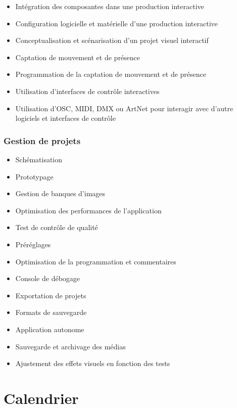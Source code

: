 \documentclass[
]{book}
\providecommand{\tightlist}{%
  \setlength{\itemsep}{0pt}\setlength{\parskip}{0pt}}
\begin{document}
\begin{itemize}
\tightlist
\item
  Intégration des composantes dans une production interactive
\item
  Configuration logicielle et matérielle d'une production interactive\\
\item
  Conceptualisation et scénarisation d'un projet visuel interactif\\
\item
  Captation de mouvement et de présence
\item
  Programmation de la captation de mouvement et de présence
\item
  Utilisation d'interfaces de contrôle interactives
\item
  Utilisation d'OSC, MIDI, DMX ou ArtNet pour interagir avec d'autre logiciels et interfaces de contrôle
\end{itemize}

\hypertarget{gestion-de-projets}{%
\subsection{Gestion de projets}\label{gestion-de-projets}}

\begin{itemize}
\tightlist
\item
  Schématisation
\item
  Prototypage
\item
  Gestion de banques d'images
\item
  Optimisation des performances de l'application
\item
  Test de contrôle de qualité
\item
  Préréglages
\item
  Optimisation de la programmation et commentaires
\item
  Console de débogage
\item
  Exportation de projets
\item
  Formats de sauvegarde\\
\item
  Application autonome
\item
  Sauvegarde et archivage des médias
\item
  Ajustement des effets visuels en fonction des tests
\end{itemize}

\hypertarget{calendrier}{%
\chapter{Calendrier}\label{calendrier}}
\end{document}
